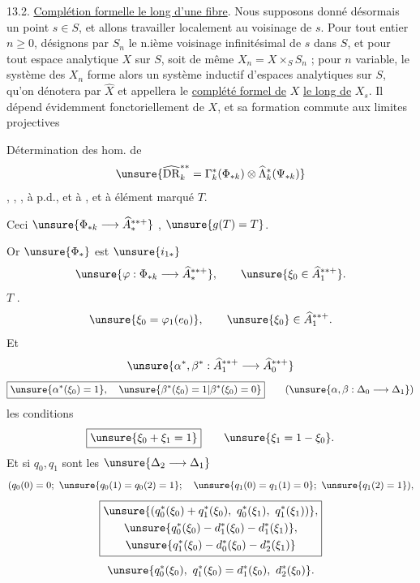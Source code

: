 13.2. \uline{Complétion formelle le long d'une fibre}. Nous supposons donné désormais un point $s\in S$, et allons travailler localement au voisinage de $s$. Pour tout entier $n\geq0$, désignons par $S_n$ le n.ième voisinage infinitésimal de $s$ dans $S$, et pour tout espace analytique $X$ sur $S$, soit de même $X_n=X\times_S S_n$ ; pour $n$ variable, le système des $X_n$ forme alors un système inductif d'espaces analytiques sur $S$, qu'on dénotera par $\widehat X$ et appellera le \uline{complété formel de} $X$ \uline{le long de} $X_s$. Il dépend évidemment fonctoriellement de $X$, et sa formation commute aux limites projectives


Détermination des hom. 
 de
\[
\unsure{\widehat{\mathrm{DR}}^{**}_k=\Gamma_k^*(\Phi_{*k})\otimes\widehat\Lambda_k^*(\Psi_{*k})}
\]
    ,
,  ,
à p.d., et à , et à élément marqué $T$.

Ceci  
$\unsure{\Phi_{*k}\longrightarrow\widehat A_*^{**+}}$ 
 ,  
  $\unsure{g(T)=T}$.

Or $\unsure{\Phi_*}$ est    
 $\unsure{i_{1*}}$  
\[
\unsure{\varphi:\Phi_{*k}\longrightarrow\widehat A_*^{**+}},\qquad
\unsure{\xi_0\in\widehat A_1^{**+}}.
\]
  
 $T$ .
\[
\unsure{\xi_0=\varphi_1(e_0)},\qquad
\unsure{\xi_0}\in\widehat A_1^{**+}.
\]
Et 
\[
\unsure{\alpha^*,\beta^*: \widehat A_1^{**+}\longrightarrow\widehat A_0^{**+}}
\]
\[
\boxed{\unsure{\alpha^*(\xi_0)=1},\quad\unsure{\beta^*(\xi_0)=1|\beta^*(\xi_0)=0}}
\qquad (\unsure{\alpha,\beta:\Delta_0\longrightarrow\Delta_1})
\]
les conditions   
 
\[
\boxed{\unsure{\xi_0+\xi_1=1}}\qquad
\unsure{\xi_1=1-\xi_0}.
\]
Et si $q_0,q_1$ sont les  $\unsure{\Delta_2\longrightarrow\Delta_1}$
\[
( q_0(0)=0;\ \unsure{q_0(1)=q_0(2)=1};\quad
\unsure{q_1(0)=q_1(1)=0};\ \unsure{q_1(2)=1}),
\]
\[
\boxed{\begin{gathered}
\unsure{(q_0^*(\xi_0)+q_1^*(\xi_0),\ q_0^*(\xi_1),\ q_1^*(\xi_1))},\\
\unsure{q_0^*(\xi_0)-d_1^*(\xi_0)-d_1^*(\xi_1)},\\
\unsure{q_1^*(\xi_0)-d_0^*(\xi_0)-d_2^*(\xi_1)}
\end{gathered}}
\]
\[
\unsure{q_0^*(\xi_0),\ q_1^*(\xi_0)=d_1^*(\xi_0),\ d_2^*(\xi_0)}.
\]

